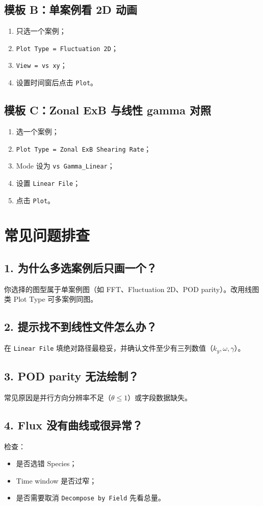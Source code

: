\documentclass[11pt,a4paper]{ctexart}
\begin{document}
\subsection{模板 B：单案例看 2D 动画}
\begin{enumerate}
  \item 只选一个案例；
  \item \texttt{Plot Type = Fluctuation 2D}；
  \item \texttt{View = vs xy}；
  \item 设置时间窗后点击 \texttt{Plot}。
\end{enumerate}

\subsection{模板 C：Zonal ExB 与线性 gamma 对照}
\begin{enumerate}
  \item 选一个案例；
  \item \texttt{Plot Type = Zonal ExB Shearing Rate}；
  \item Mode 设为 \texttt{vs Gamma\_Linear}；
  \item 设置 \texttt{Linear File}；
  \item 点击 \texttt{Plot}。
\end{enumerate}

\section{常见问题排查}
\subsection*{1. 为什么多选案例后只画一个？}
你选择的图型属于单案例图（如 FFT、Fluctuation 2D、POD parity）。改用线图类 Plot Type 可多案例同图。

\subsection*{2. 提示找不到线性文件怎么办？}
在 \texttt{Linear File} 填绝对路径最稳妥，并确认文件至少有三列数值（$k_y,\omega,\gamma$）。

\subsection*{3. POD parity 无法绘制？}
常见原因是并行方向分辨率不足（\(\theta \le 1\)）或字段数据缺失。

\subsection*{4. Flux 没有曲线或很异常？}
检查：
\begin{itemize}
  \item 是否选错 Species；
  \item Time window 是否过窄；
  \item 是否需要取消 \texttt{Decompose by Field} 先看总量。
\end{itemize}
\end{document}

